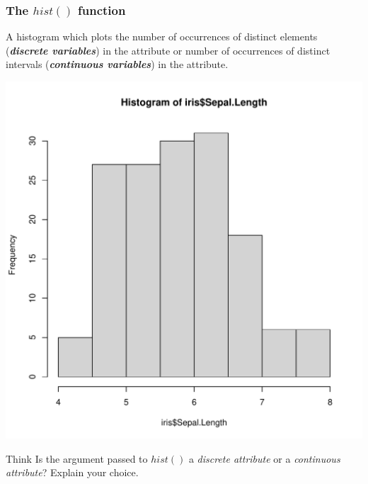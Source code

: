 \documentclass[12pt]{book}\usepackage{knitr}
\begin{document}
\subsubsection{The $hist()$ function}
\noindent A histogram which plots the number of occurrences of distinct elements (\textbf{\emph{discrete variables}}) in the attribute or number of occurrences of distinct intervals (\textbf{\emph{continuous variables}}) in the attribute.
\begin{knitrout}
\color{fgcolor}\begin{kframe}
\begin{alltt}
\hlopt{$} 
\end{alltt}
\end{kframe}
\includegraphics[width=\maxwidth]{figure/hist-1} 
\begin{kframe}\begin{alltt}
\end{alltt}
\end{kframe}
\end{knitrout}

\begin{DIY}{Think}
Is the argument passed to $hist()$ a \emph{discrete attribute} or a \emph{continuous attribute}? Explain your choice.
\end{DIY}
\end{document}
